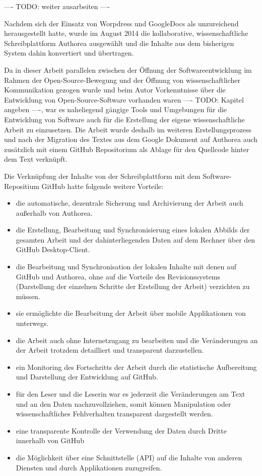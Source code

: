 ---- TODO: weiter ausarbeiten ----

Nachdem sich der Einsatz von Worpdress und GoogleDocs als unzureichend herausgestellt hatte, wurde im August 2014 die kollaborative, wissenschaftliche Schreibplattform Authorea ausgewählt und die Inhalte aus dem bisherigen System dahin konvertiert und übertragen.

Da in dieser Arbeit parallelen zwischen der Öffnung der Softwareentwicklung im Rahmen der Open-Source-Bewegung und der Öffnung von wissenschaftlicher Kommunikation gezogen wurde und beim Autor Vorkenntnisse über die Entwicklung von Open-Source-Software vorhanden waren ---- TODO: Kapitel angeben ----, war es naheliegend gängige Tools und Umgebungen für die Entwicklung von Software auch für die Erstellung der eigene wissenschaftliche Arbeit zu einzusetzen. Die Arbeit wurde deshalb im weiteren Erstellungsprozess und nach der Migration des Textes aus dem Google Dokument auf Authorea auch zusätzlich mit einem GitHub Repositorium als Ablage für den Quellcode hinter dem Text verknüpft.

Die Verknüpfung der Inhalte von der Schreibplattform mit dem Software-Repositium GitHub hatte folgende weitere Vorteile:
\begin{itemize}
\item die automatische, dezentrale Sicherung und Archivierung der Arbeit auch außerhalb von Authorea.
\item die Erstellung, Bearbeitung und Synchronisierung eines lokalen Abbilds der gesamten Arbeit und der dahinterliegenden Daten auf dem Rechner über den GitHub Desktop-Client.
\item die Bearbeitung und Synchronisation der lokalen Inhalte mit denen auf GitHub und Authorea, ohne auf die Vorteile des Revisionssystems (Darstellung der einzelnen Schritte der Erstellung der Arbeit) verzichten zu müssen.
\item sie ermöglichte die Bearbeitung der Arbeit über mobile Applikationen von unterwegs.
\item die Arbeit auch ohne Internetzugang zu bearbeiten und die Veränderungen an der Arbeit trotzdem detailliert und transparent darzustellen.
\item ein Monitoring des Fortschritts der Arbeit durch die statistische Aufbereitung und Darstellung der Entwicklung auf GitHub.
\item für den Leser und die Leserin war es jederzeit die Veränderungen am Text und an den Daten nachzuvollziehen, somit können Manipulation oder wissenschaftliches Fehlverhalten transparent dargestellt werden.
\item eine transparente Kontrolle der Verwendung der Daten durch Dritte innerhalb von GitHub
\item die Möglichkeit über eine Schnittstelle (API) auf die Inhalte von anderen Diensten und durch Applikationen zuzugreifen.
\end{itemize}

